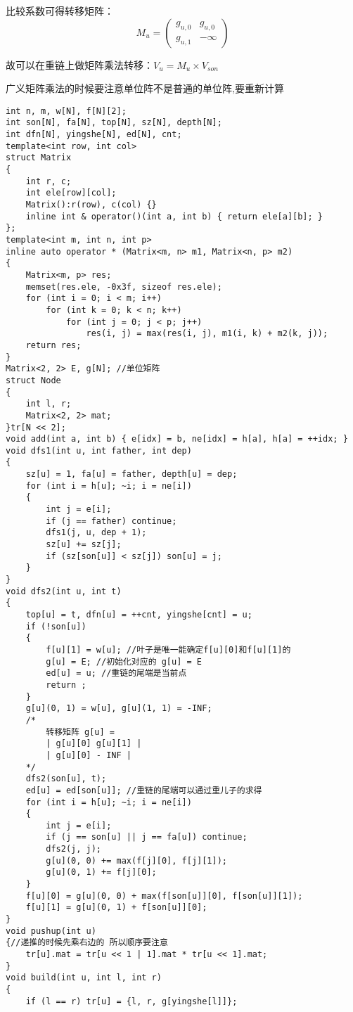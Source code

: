 \documentclass[a4paper, fontset=none]{ctexart}
\begin{document}
比较系数可得转移矩阵：
\[M_u = \begin{pmatrix}g_{u, 0} & g_{u, 0} \\ g_{u, 1} & -\infty\end{pmatrix}\]

故可以在重链上做矩阵乘法转移：$V_u = M_u \times V_{son}$

广义矩阵乘法的时候要注意单位阵不是普通的单位阵,要重新计算

\begin{verbatim}
int n, m, w[N], f[N][2];
int son[N], fa[N], top[N], sz[N], depth[N];
int dfn[N], yingshe[N], ed[N], cnt;
template<int row, int col>
struct Matrix
{
    int r, c;
    int ele[row][col];
    Matrix():r(row), c(col) {}
    inline int & operator()(int a, int b) { return ele[a][b]; }
};
template<int m, int n, int p>
inline auto operator * (Matrix<m, n> m1, Matrix<n, p> m2)
{
    Matrix<m, p> res;
    memset(res.ele, -0x3f, sizeof res.ele);
    for (int i = 0; i < m; i++)
        for (int k = 0; k < n; k++)
            for (int j = 0; j < p; j++)
                res(i, j) = max(res(i, j), m1(i, k) + m2(k, j));
    return res;
}
Matrix<2, 2> E, g[N]; //单位矩阵
struct Node
{
    int l, r;
    Matrix<2, 2> mat;
}tr[N << 2];
void add(int a, int b) { e[idx] = b, ne[idx] = h[a], h[a] = ++idx; }
void dfs1(int u, int father, int dep)
{
    sz[u] = 1, fa[u] = father, depth[u] = dep;
    for (int i = h[u]; ~i; i = ne[i])
    {
        int j = e[i];
        if (j == father) continue;
        dfs1(j, u, dep + 1);
        sz[u] += sz[j];
        if (sz[son[u]] < sz[j]) son[u] = j;
    }
}
void dfs2(int u, int t)
{
    top[u] = t, dfn[u] = ++cnt, yingshe[cnt] = u;
    if (!son[u])
    {
        f[u][1] = w[u]; //叶子是唯一能确定f[u][0]和f[u][1]的
        g[u] = E; //初始化对应的 g[u] = E
        ed[u] = u; //重链的尾端是当前点
        return ;
    }
    g[u](0, 1) = w[u], g[u](1, 1) = -INF;
    /*
        转移矩阵 g[u] =
        | g[u][0] g[u][1] |
        | g[u][0] - INF |
    */
    dfs2(son[u], t);
    ed[u] = ed[son[u]]; //重链的尾端可以通过重儿子的求得
    for (int i = h[u]; ~i; i = ne[i])
    {
        int j = e[i];
        if (j == son[u] || j == fa[u]) continue;
        dfs2(j, j);
        g[u](0, 0) += max(f[j][0], f[j][1]);
        g[u](0, 1) += f[j][0];
    }
    f[u][0] = g[u](0, 0) + max(f[son[u]][0], f[son[u]][1]);
    f[u][1] = g[u](0, 1) + f[son[u]][0];
}
void pushup(int u)
{//递推的时候先乘右边的 所以顺序要注意
    tr[u].mat = tr[u << 1 | 1].mat * tr[u << 1].mat;
}
void build(int u, int l, int r)
{
    if (l == r) tr[u] = {l, r, g[yingshe[l]]};

\end{verbatim}
\end{document}
